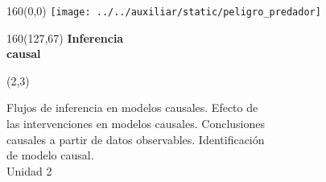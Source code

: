 \documentclass[shownotes,aspectratio=169]{beamer}
\begin{document}
\color{black!85}
\large


\begin{frame}

\begin{textblock}{160}(0,0)
\texttt{[image: ../../auxiliar/static/peligro\_predador]}
\end{textblock}

\begin{textblock}{160}(127,67)
\LARGE \textcolor{black!5}{\fontsize{22}{0}\selectfont \textbf{Inferencia  \\[-0.1cm] \hspace{0.5cm} causal}}
\end{textblock}

\begin{textblock}{55}(2,3)
\begin{turn}{0}
\parbox{15cm}{\small
\textcolor{black!95}{Flujos de inferencia en modelos causales. Efecto de}\\
\textcolor{black!95}{las intervenciones en modelos causales. Conclusiones} \\
\textcolor{black!95}{causales a partir de datos observables. Identificación} \\
\textcolor{black!95}{de modelo causal.} \\
\normalsize\textcolor{black!95}{Unidad 2} \\
}
\end{turn}
\end{textblock}

\end{frame}



%
%
%
%
%
\end{document}
